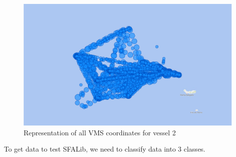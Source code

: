 \begin{figure}[H]
    \centering
    \includegraphics[width=0.8\linewidth]{Chapters/img/2All.pdf}
    \caption{Representation of all VMS coordinates for vessel 2 }
    \label{fig:bi_2_all}
\end{figure}
\newpage
To get data to test SFALib, we need to classify data into 3 classes.
